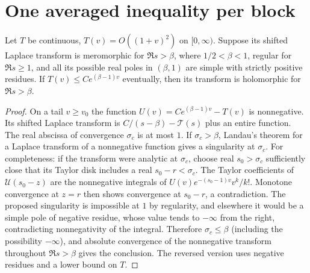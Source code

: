 \documentclass[11pt,letterpaper]{article}
\theoremstyle{definition}\newtheorem{definition}[theorem]{Definition}
\theoremstyle{remark}\newtheorem{remark}[theorem]{Remark}
\begin{document}
\section{One averaged inequality per block}\label{sec:block}
\begin{lemma}\label{lem:landau}
Let $T$ be continuous, $T(v)=O((1+v)^2)$ on $[0,\infty)$. Suppose its shifted Laplace transform is meromorphic for $\Re s>\beta$, where $1/2<\beta<1$, regular for $\Re s\ge1$, and all its possible real poles in $(\beta,1)$ are simple with strictly positive residues. If $T(v)\le C e^{(\beta-1)v}$ eventually, then its transform is holomorphic for $\Re s>\beta$.
\end{lemma}
\begin{proof}
On a tail $v\ge v_0$ the function $U(v)=C e^{(\beta-1)v}-T(v)$ is nonnegative. Its shifted Laplace transform is $C/(s-\beta)-\mathcal T(s)$ plus an entire function. The real abscissa of convergence $\sigma_c$ is at most $1$. If $\sigma_c>\beta$, Landau's theorem for a Laplace transform of a nonnegative function gives a singularity at $\sigma_c$. For completeness: if the transform were analytic at $\sigma_c$, choose real $s_0>\sigma_c$ sufficiently close that its Taylor disk includes a real $s_0-r<\sigma_c$. The Taylor coefficients of $\mathcal U(s_0-z)$ are the nonnegative integrals of $U(v)e^{-(s_0-1)v}v^k/k!$. Monotone convergence at $z=r$ then shows convergence at $s_0-r$, a contradiction. The proposed singularity is impossible at $1$ by regularity, and elsewhere it would be a simple pole of negative residue, whose value tends to $-\infty$ from the right, contradicting nonnegativity of the integral. Therefore $\sigma_c\le\beta$ (including the possibility $-\infty$), and absolute convergence of the nonnegative transform throughout $\Re s>\beta$ gives the conclusion. The reversed version uses negative residues and a lower bound on $T$.
\end{proof}
\end{document}
